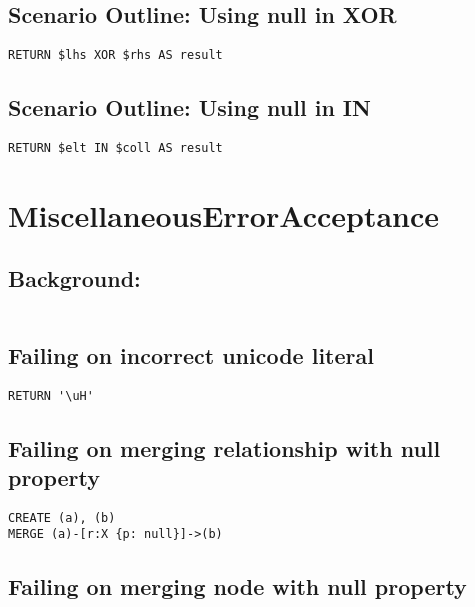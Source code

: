 \subsection{Scenario Outline: Using null in XOR}

\begin{lstlisting}
RETURN $lhs XOR $rhs AS result
\end{lstlisting}

\subsection{Scenario Outline: Using null in IN}

\begin{lstlisting}
RETURN $elt IN $coll AS result
\end{lstlisting}
\section{MiscellaneousErrorAcceptance}


\subsection{Background:}

\begin{lstlisting}
\end{lstlisting}

\subsection{Failing on incorrect unicode literal}

\begin{lstlisting}
RETURN '\uH'
\end{lstlisting}

\subsection{Failing on merging relationship with null property}

\begin{lstlisting}
CREATE (a), (b)
MERGE (a)-[r:X {p: null}]->(b)
\end{lstlisting}

\subsection{Failing on merging node with null property}

